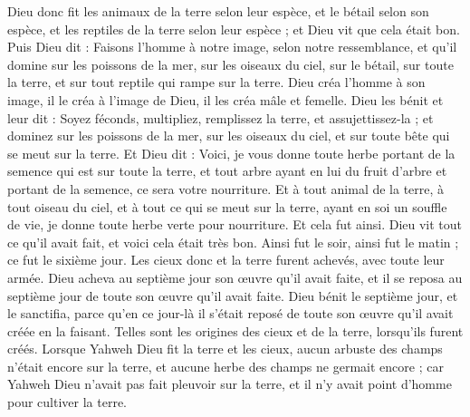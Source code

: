 \begin{multicols}{2}
Dieu donc fit les animaux de la terre selon leur espèce, et le bétail selon son espèce, et les reptiles de la terre selon leur espèce ; et Dieu vit que cela était bon.
Puis Dieu dit : Faisons l'homme à notre image, selon notre ressemblance, et qu'il domine sur les poissons de la mer, sur les oiseaux du ciel, sur le bétail, sur toute la terre, et sur tout reptile qui rampe sur la terre.
Dieu créa l'homme à son image, il le créa à l'image de Dieu, il les créa mâle et femelle.
Dieu les bénit et leur dit : Soyez féconds, multipliez, remplissez la terre, et assujettissez-la ; et dominez sur les poissons de la mer, sur les oiseaux du ciel, et sur toute bête qui se meut sur la terre.
Et Dieu dit : Voici, je vous donne toute herbe portant de la semence qui est sur toute la terre, et tout arbre ayant en lui du fruit d'arbre et portant de la semence, ce sera votre nourriture.
Et à tout animal de la terre, à tout oiseau du ciel, et à tout ce qui se meut sur la terre, ayant en soi un souffle de vie, je donne toute herbe verte pour nourriture. Et cela fut ainsi.
Dieu vit tout ce qu'il avait fait, et voici cela était très bon. Ainsi fut le soir, ainsi fut le matin ; ce fut le sixième jour.
\VerseOne{}Les cieux donc et la terre furent achevés, avec toute leur armée.
Dieu acheva au septième jour son œuvre qu'il avait faite, et il se reposa au septième jour de toute son œuvre qu'il avait faite.
Dieu bénit le septième jour, et le sanctifia, parce qu'en ce jour-là il s'était reposé de toute son œuvre qu'il avait créée en la faisant.
Telles sont les origines des cieux et de la terre, lorsqu'ils furent créés.
Lorsque Yahweh Dieu fit la terre et les cieux, aucun arbuste des champs n’était encore sur la terre, et aucune herbe des champs ne germait encore ; car Yahweh Dieu n'avait pas fait pleuvoir sur la terre, et il n'y avait point d'homme pour cultiver la terre.

\end{multicols}
